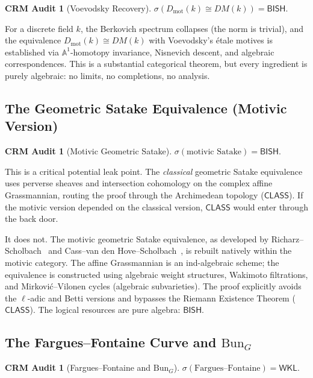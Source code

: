 \documentclass[11pt,a4paper]{article}
\theoremstyle{plain}
\theoremstyle{definition}
\newtheorem{audit}[theorem]{CRM Audit}
\newcommand{\BISH}{\textsf{BISH}}
\newcommand{\WKL}{\textsf{WKL}}
\newcommand{\CLASS}{\textsf{CLASS}}
\newcommand{\Dmot}{D_{\mathrm{mot}}}
\newcommand{\Bun}{\mathrm{Bun}}
\newcommand{\A}{\mathbb{A}}
\newcommand{\sig}{\sigma}
\begin{document}
\begin{audit}[Voevodsky Recovery]\label{audit:voevodsky}
$\sig(\Dmot(k) \cong DM(k)) = \BISH$.
\end{audit}

For a discrete field $k$, the Berkovich spectrum collapses (the norm is trivial), and the equivalence $\Dmot(k) \cong DM(k)$ with Voevodsky's \'etale motives is established via $\A^1$-homotopy invariance, Nisnevich descent, and algebraic correspondences. This is a substantial categorical theorem, but every ingredient is purely algebraic: no limits, no completions, no analysis.


\subsection{The Geometric Satake Equivalence (Motivic Version)}

\begin{audit}[Motivic Geometric Satake]\label{audit:satake}
$\sig(\text{motivic Satake}) = \BISH$.
\end{audit}

This is a critical potential leak point. The \emph{classical} geometric Satake equivalence uses perverse sheaves and intersection cohomology on the complex affine Grassmannian, routing the proof through the Archimedean topology ($\CLASS$). If the motivic version depended on the classical version, $\CLASS$ would enter through the back door.

It does not. The motivic geometric Satake equivalence, as developed by Richarz--Scholbach~\cite{richarz-scholbach} and Cass--van den Hove--Scholbach~\cite{cass-vdh-scholbach}, is rebuilt natively within the motivic category. The affine Grassmannian is an ind-algebraic scheme; the equivalence is constructed using algebraic weight structures, Wakimoto filtrations, and Mirkovi\'c--Vilonen cycles (algebraic subvarieties). The proof explicitly avoids the $\ell$-adic and Betti versions and bypasses the Riemann Existence Theorem ($\CLASS$). The logical resources are pure algebra: $\BISH$.


\subsection{The Fargues--Fontaine Curve and $\Bun_G$}

\begin{audit}[Fargues--Fontaine and $\Bun_G$]\label{audit:ff}
$\sig(\text{Fargues--Fontaine}) = \WKL$.
\end{audit}
\end{document}
